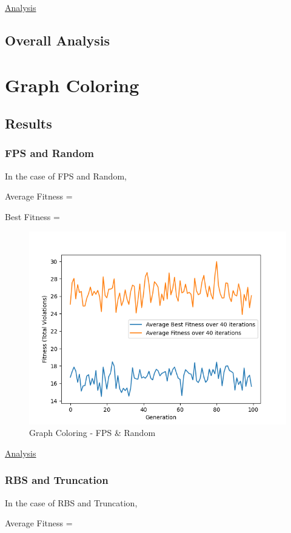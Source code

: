 \documentclass[11pt, letterpaper]{article}
\begin{document}
\underline{Analysis}

\subsection {Overall Analysis}

\newpage

\section{Graph Coloring}
\subsection {Results} 
\subsubsection {FPS and Random}
In the case of FPS and Random,

Average Fitness = 

Best Fitness = 
\begin{figure}[H]
    \centering
    \includegraphics[scale = 0.6]{images/graphcoloring_fp_rd.png}
    \caption {Graph Coloring - FPS \& Random}
    \label {fig:gcFR}
\end{figure}
\underline{Analysis}
\subsubsection {RBS and Truncation}
In the case of RBS and Truncation,

Average Fitness = 
\end{document}
